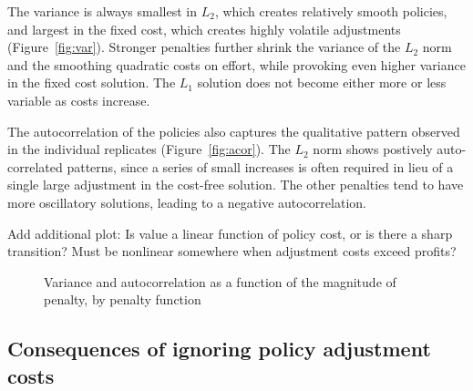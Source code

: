 \documentclass[authoryear, review, 12pt]{elsarticle}
\begin{document}
The variance is always smallest in $L_2$, which creates relatively smooth policies, and largest in the fixed cost, which creates highly volatile adjustments (Figure~\ref{fig:var}).  Stronger penalties further shrink the variance of the $L_2$ norm and the smoothing quadratic costs on effort, while provoking even higher variance in the fixed cost solution.  The $L_1$ solution does not become either more or less variable as costs increase.  

The autocorrelation of the policies also captures the qualitative pattern observed in the individual replicates (Figure~\ref{fig:acor}).  The $L_2$ norm shows postively auto-correlated patterns, since a series of small increases is often required in lieu of a single large adjustment in the cost-free solution.  The other penalties tend to have more oscillatory solutions, leading to a negative autocorrelation.  



{\color{green}Add additional plot: Is value a linear function of policy cost, or is there a sharp transition? }
{\color{blue} Must be nonlinear somewhere when adjustment costs exceed profits? }




\begin{figure}
  \begin{center}
    \caption{Variance and autocorrelation as a function of the magnitude of penalty, by penalty function}\label{fig:summarystats}
  \end{center}
\end{figure}


\subsection{Consequences of ignoring policy adjustment costs}
\end{document}

